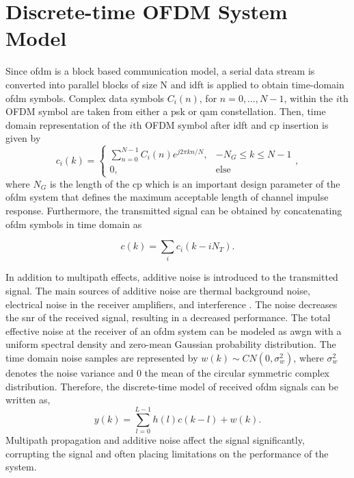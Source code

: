 \section{Discrete-time OFDM System Model}\label{sec:discmod}

Since \gls{ofdm} is a block based communication model, a serial data stream is converted into parallel blocks of size N and \gls{idft} is applied to obtain time-domain \gls{ofdm} symbols. 
Complex data symbols $C_i(n)$, for $n=0,\ldots,N-1$, within the $i$th OFDM symbol are taken from either a \gls{psk} or \gls{qam} constellation. Then, time domain representation of the $i$th OFDM symbol after \gls{idft} and \gls{cp} insertion is given by
%
\begin{equation}\label{IDFT}
c_i(k)= 
\begin{cases}
   \sum_{n=0}^{N-1}{C_i(n)e^{j2\pi kn/N}},& -N_G \leq k \leq N-1\\
   0,&\text{else}
\end{cases},
\end{equation}
%
where $N_G$ is the length of the \gls{cp} which is an important design parameter of the \gls{ofdm} system that defines the maximum acceptable length of channel impulse response. Furthermore, the transmitted signal can be obtained by concatenating \gls{ofdm} symbols in time domain as

\begin{equation}\label{concat}
c(k)=\sum_i{c_i(k -iN_T)}.
\end{equation} 

In addition to multipath effects, additive noise is introduced to the transmitted signal. The main sources of additive noise are thermal background noise, electrical noise in the receiver amplifiers, and interference \cite{StuberOFDM}. The noise decreases the \gls{snr} of the received signal, resulting in a decreased performance. The total effective noise at the receiver of an \gls{ofdm} system can be modeled as \gls{awgn} with a uniform spectral density and zero-mean Gaussian probability distribution. The time domain noise samples are represented by $w(k) \sim CN(0,\sigma_w^2)$, where $\sigma_w^2$ denotes the noise variance and $0$ the mean of the circular symmetric complex distribution. Therefore, the discrete-time model of received \gls{ofdm} signals can be written as,
\begin{equation}
\label{eqn:multipath}
y(k) = \sum_{l = 0}^{L-1} h(l)c(k-l) + w(k).
\end{equation}
%
Multipath propagation and additive noise affect the signal significantly, corrupting the signal and often placing limitations on the performance of the system.








